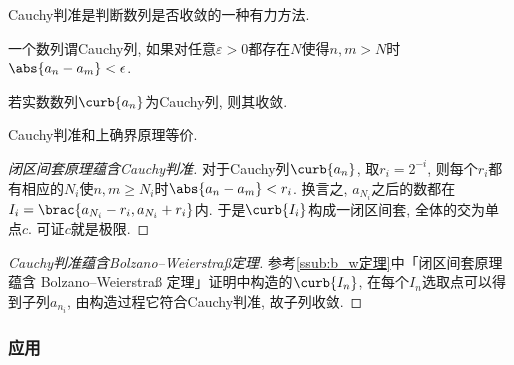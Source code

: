 \documentclass[hidelinks]{ctexart}
\begin{document}
Cauchy判准是判断数列是否收敛的一种有力方法.
\begin{definition}[Cauchy列]
    一个数列谓Cauchy列, 如果对任意$\varepsilon>0$都存在$N$使得$n,m>N$时$\abs{a_n-a_m}<\epsilon$.
\end{definition}
\begin{finale}
    \begin{theorem}[Cauchy判准]
        若实数数列$\curb{a_n}$为Cauchy列, 则其收敛.
    \end{theorem}
    \begin{theorem}[等价性]
        Cauchy判准和上确界原理等价.
    \end{theorem}
\end{finale}
\begin{proof}[闭区间套原理蕴含Cauchy判准]
    对于Cauchy列$\curb{a_n}$, 取$r_i=2^{-i}$, 则每个$r_i$都有相应的$N_i$使$n,m\ge N_i$时$\abs{a_n-a_m}<r_i$. 换言之, $a_{N_i}$之后的数都在$I_i = \brac{a_{N_i}-r_i,a_{N_i}+r_i}$内. 于是$\curb{I_i}$构成一闭区间套, 全体的交为单点$c$. 可证$c$就是极限. 
\end{proof}
\begin{proof}[Cauchy判准蕴含Bolzano–Weierstra\ss 定理]
    参考\cref{ssub:b_w定理}中「闭区间套原理蕴含 Bolzano–Weierstraß 定理」证明中构造的$\curb{I_n}$, 在每个$I_n$选取点可以得到子列$a_{n_i}$, 由构造过程它符合Cauchy判准, 故子列收敛.
\end{proof}


\subsubsection{应用} %
\label{ssub:应用}
\end{document}
